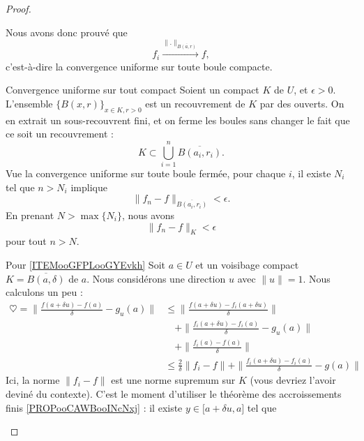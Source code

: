 \begin{proof}
\begin{subproof}
        Nous avons donc prouvé que
        \begin{equation}
            f_i\stackrel{\| . \|_{\overline{ B(a,r) }}}{\longrightarrow}f,
        \end{equation}
        c'est-à-dire la convergence uniforme sur toute boule compacte.
    \item[Convergence uniforme sur tout compact]
        Soient un compact \( K\) de \( U\), et \( \epsilon>0\). L'ensemble \( \{ B(x,r) \}_{x\in K, r>0}\) est un recouvrement de \( K\) par des ouverts. On en extrait un sous-recouvrent fini, et on ferme les boules sans changer le fait que ce soit un recouvrement :
        \begin{equation}
            K\subset \bigcup_{i=1}^n\overline{ B(a_i, r_i) }.
        \end{equation}
        Vue la convergence uniforme sur toute boule fermée, pour chaque \( i\), il existe \( N_i\) tel que \( n>N_i\) implique
        \begin{equation}
            \| f_n-f \|_{\overline{ B(a_i,r_i) }}<\epsilon.
        \end{equation}
        En prenant \( N>\max\{ N_i \}\), nous avons
        \begin{equation}
            \| f_n-f \|_K<\epsilon
        \end{equation}
        pour tout \( n>N\).
    \item[Pour \ref{ITEMooGFPLooGYEvkh}]
        Soit \( a\in U\) et un voisibage compact \( K=\overline{ B(a,\delta) }\) de \( a\). Nous considérons une direction \( u\) avec \( \| u \|=1\). Nous calculons un peu :
        \begin{subequations}
            \begin{align}
                \heartsuit=\| \frac{ f(a+\delta u)-f(a) }{ \delta }-g_u(a) \|&\leq \| \frac{ f(a+\delta u)-f_i(a+\delta u) }{ \delta } \|\\
                &\quad +\|  \frac{ f_i(a+\delta u)-f_i(a) }{ \delta }-g_u(a) \|      \nonumber\\
                &\quad +\| \frac{ f_i(a)-f(a) }{ \delta } \|        \nonumber\\  
                &\leq \frac{ 2 }{ \delta }\| f_i-f \|+\| \frac{ f_i(a+\delta u)-f_i(a) }{ \delta }-g(a) \|
            \end{align}
        \end{subequations}
        Ici, la norme \( \| f_i-f \|\) est une norme supremum sur \( K\) (vous devriez l'avoir deviné du contexte). C'est le moment d'utiliser le théorème des accroissements finis \ref{PROPooCAWBooINcNxj} : il existe \( y\in \mathopen[ a+\delta u , a \mathclose]\) tel que 

\end{subproof}
\end{proof}
